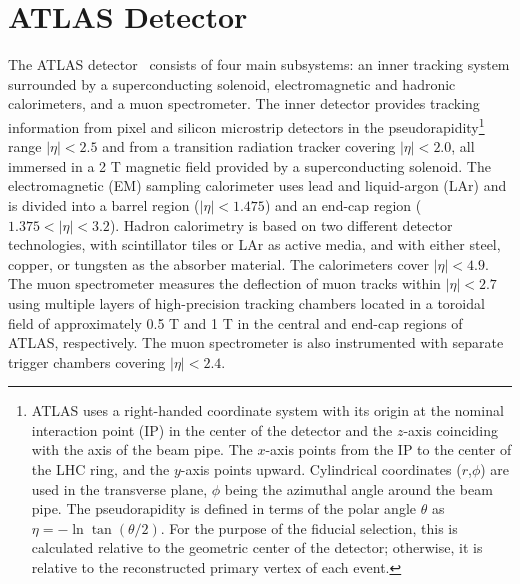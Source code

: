 \section{ATLAS Detector}
\label{sec:detector}
The ATLAS detector~\cite{Aad:2008zzm} consists of
four main subsystems: an inner tracking system surrounded by a
superconducting solenoid, electromagnetic and hadronic calorimeters, and a muon spectrometer.
The inner detector provides tracking information from
pixel and silicon microstrip detectors in the pseudorapidity\footnote{ATLAS uses a
right-handed coordinate system with its origin at the nominal
interaction point (IP) in the center of the detector and the $z$-axis
coinciding with the axis of the beam pipe.  The $x$-axis points from
the IP to the center of the LHC ring, and the $y$-axis points
upward. Cylindrical coordinates ($r$,$\phi$) are used in the
transverse plane, $\phi$ being the azimuthal angle around the beam
pipe. The pseudorapidity is defined in terms of the polar angle
$\theta$ as $\eta = - \ln \tan(\theta/2)$.  For the purpose of the
fiducial selection, this is calculated relative to the geometric
center of the detector; otherwise, it is relative to the reconstructed
primary vertex of each event.} range $|\eta|<2.5$ and from a
transition radiation tracker covering $|\eta|<2.0$, all immersed in a 2 T magnetic field
provided by a superconducting solenoid.
The electromagnetic (EM) sampling calorimeter uses lead and liquid-argon (LAr)
and is divided into a barrel region ($|\eta|<1.475$) and an end-cap region
($1.375<|\eta|<3.2$).
Hadron calorimetry is based on two different detector technologies, with
scintillator tiles or LAr as active media, and with either steel, copper, or
tungsten as the absorber material. The calorimeters cover $|\eta|<4.9$.
The muon spectrometer measures the deflection of muon tracks within $|\eta|<2.7$
using multiple layers of high-precision tracking chambers located in a
toroidal field of approximately 0.5 T and 1 T in the central and end-cap
regions of ATLAS, respectively. The muon
spectrometer is also instrumented with separate trigger chambers
covering $|\eta|<2.4$.
